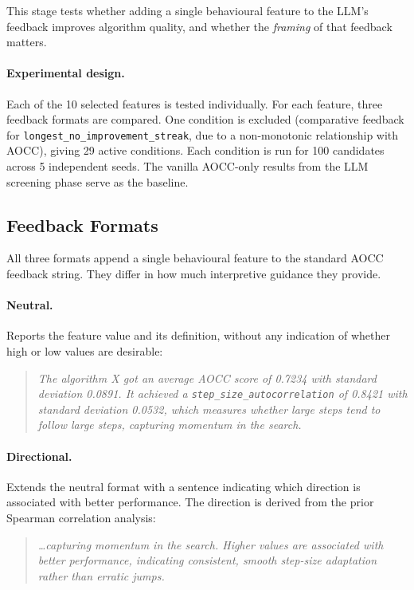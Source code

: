 This stage tests whether adding a single behavioural feature to the LLM's feedback improves algorithm quality, and whether the \emph{framing} of that feedback matters.

\paragraph{Experimental design.}
Each of the 10 selected features is tested individually. For each feature, three feedback formats are compared. One condition is excluded (comparative feedback for \texttt{longest\_no\_improvement\_streak}, due to a non-monotonic relationship with AOCC), giving 29 active conditions. Each condition is run for 100 candidates across 5 independent seeds. The vanilla AOCC-only results from the LLM screening phase serve as the baseline.

\subsection{Feedback Formats}
\label{sec:meth-feedback-formats}

All three formats append a single behavioural feature to the standard AOCC feedback string. They differ in how much interpretive guidance they provide.

\paragraph{Neutral.}
Reports the feature value and its definition, without any indication of whether high or low values are desirable:

\begin{quote}
\small\itshape
The algorithm X got an average AOCC score of 0.7234 with standard deviation 0.0891. It achieved a \texttt{step\_size\_autocorrelation} of 0.8421 with standard deviation 0.0532, which measures whether large steps tend to follow large steps, capturing momentum in the search.
\end{quote}

\paragraph{Directional.}
Extends the neutral format with a sentence indicating which direction is associated with better performance. The direction is derived from the prior Spearman correlation analysis:

\begin{quote}
\small\itshape
\ldots capturing momentum in the search. Higher values are associated with better performance, indicating consistent, smooth step-size adaptation rather than erratic jumps.
\end{quote}

